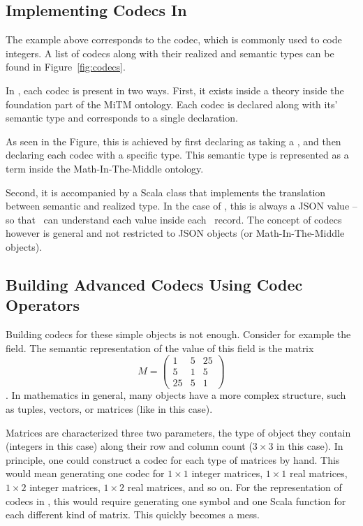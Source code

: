 \subsection{Implementing Codecs In \mmt}\label{sec:vt:mmt}


The example above corresponds to the  codec, which is commonly used to code integers. 
A list of codecs along with their realized and semantic types can be found in Figure~\ref{fig:codecs}. 

In \mmt, each codec is present in two ways.
First, it exists inside a  theory inside the foundation part of the MiTM ontology. 
Each codec is declared along with its' semantic type and corresponds to a single declaration. 

As seen in the Figure, this is achieved by first declaring  as taking a , and then declaring each codec with a specific type. 
This semantic type is represented as a term inside the Math-In-The-Middle ontology. 

Second, it is accompanied by a Scala class that implements the translation between semantic and realized type. 
In the case of \lmfdb, this is always a JSON value -- so that \mmt\ can understand each value inside each \lmfdb\ record. 
The concept of codecs however is general and not restricted to JSON objects (or Math-In-The-Middle objects). 

\subsection{Building Advanced Codecs Using Codec Operators}\label{sec:vt:operators}

Building codecs for these simple objects is not enough. 
Consider for example the  field. 
The semantic representation of the value of this field is the matrix $$M = \left( \begin{array}{ccc}
1 & 5 & 25 \\
5 & 1 & 5 \\
25 & 5 & 1 \end{array} \right) $$. 
In mathematics in general, many objects have a more complex structure, such as tuples, vectors, or matrices (like in this case). 

Matrices are characterized three two parameters, the type of object they contain (integers in this case) along their row and column count ($3 \times 3$ in this case). 
In principle, one could construct a codec for each type of matrices by hand. 
This would mean generating one codec for $1 \times 1$ integer matrices, $1 \times 1$ real matrices, $1 \times 2$ integer matrices, $1 \times  2$ real matrices, and so on. 
For the representation of codecs in \mmt, this would require generating one symbol and one Scala function for each different kind of matrix. 
This quickly becomes a mess. 

